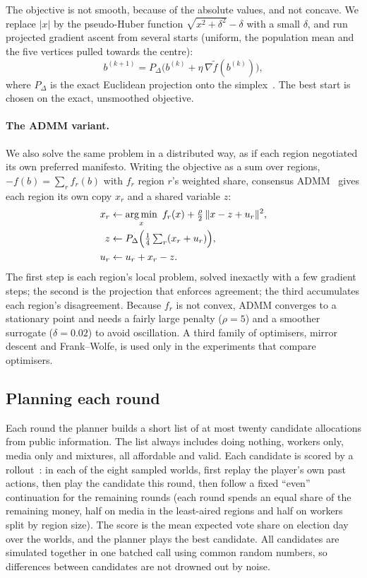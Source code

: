 \documentclass[11pt,a4paper,oneside]{report}
\newcommand{\simplex}{\Delta}
\DeclareMathOperator*{\argmin}{arg\,min}
\begin{document}
The objective is not smooth, because of the absolute values, and not concave. We replace $|x|$ by the
pseudo-Huber function $\sqrt{x^2+\delta^2}-\delta$ with a small $\delta$, and run projected gradient ascent
from several starts (uniform, the population mean and the five vertices pulled towards the centre):
\begin{equation}
  b^{(k+1)} = P_{\simplex}\bigl(b^{(k)} + \eta\,\nabla \tilde f(b^{(k)})\bigr),
\end{equation}
where $P_{\simplex}$ is the exact Euclidean projection onto the simplex~\cite{duchi2008}. The best start is
chosen on the exact, unsmoothed objective.

\paragraph{The ADMM variant.} We also solve the same problem in a distributed way, as if each region
negotiated its own preferred manifesto. Writing the objective as a sum over regions,
$-f(b) = \sum_r f_r(b)$ with $f_r$ region $r$'s weighted share, consensus ADMM~\cite{boyd2011} gives each
region its own copy $x_r$ and a shared variable $z$:
\begin{align}
  x_r &\leftarrow \argmin_{x}\ f_r(x) + \tfrac{\rho}{2}\,\lVert x - z + u_r \rVert^2, \\
  z   &\leftarrow P_{\simplex}\Bigl(\tfrac14 \textstyle\sum_r (x_r + u_r)\Bigr), \\
  u_r &\leftarrow u_r + x_r - z .
\end{align}
The first step is each region's local problem, solved inexactly with a few gradient steps; the second is the
projection that enforces agreement; the third accumulates each region's disagreement. Because $f_r$ is not
convex, ADMM converges to a stationary point and needs a fairly large penalty ($\rho = 5$) and a smoother
surrogate ($\delta = 0.02$) to avoid oscillation. A third family of optimisers, mirror descent and
Frank--Wolfe, is used only in the experiments that compare optimisers.

\subsection{Planning each round}

Each round the planner builds a short list of at most twenty candidate allocations from public
information. The list always includes doing nothing, workers only, media only and mixtures, all affordable
and valid. Each candidate is scored by a rollout~\cite{bertsekas1997}: in each of the eight sampled worlds,
first replay the player's own past actions, then play the candidate this round, then follow a fixed
``even'' continuation for the remaining rounds (each round spends an equal share of the remaining money,
half on media in the least-aired regions and half on workers split by region size). The score is the mean
expected vote share on election day over the worlds, and the planner plays the best candidate. All
candidates are simulated together in one batched call using common random numbers, so differences between
candidates are not drowned out by noise.
\end{document}
